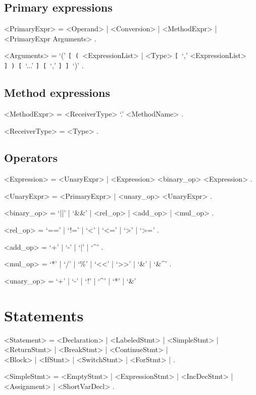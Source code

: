 \documentclass{article}
\def\lopt{\synshortsoff\texttt{[}\synshorts~}
\def\ropt{\synshortsoff\texttt{]}\synshorts~}
\def\lgrp{\synshortsoff\texttt{(}\synshorts~}
\def\rgrp{\synshortsoff\texttt{)}\synshorts~}
\begin{document}
\subsection*{Primary expressions}
\begin{grammar}
	<PrimaryExpr> = <Operand> | <Conversion> | <MethodExpr> | <PrimaryExpr Arguments> .
	
	<Arguments> = `(' \lopt \lgrp <ExpressionList> | <Type> \lopt `,' <ExpressionList> \ropt \rgrp \lopt `...' \ropt \lopt `,' \ropt \ropt `)' .
	
\end{grammar}


\subsection*{Method expressions}
\begin{grammar}
	<MethodExpr> = <ReceiverType> `.' <MethodName> .

	<ReceiverType> = <Type> .
\end{grammar}

\subsection*{Operators}
\begin{grammar}
	<Expression> = <UnaryExpr> | <Expression> <binary_op> <Expression> .

	<UnaryExpr> = <PrimaryExpr> | <unary_op> <UnaryExpr> .

	<binary_op>  = `||' | `\&\&' | <rel_op> | <add_op> | <mul_op> .

	<rel_op> = `==' | `!=' | `<' | `<=' | `>' | `>=' .

	<add_op> = `+' | `-' | `|' | `\^{}' .

	<mul_op> = `*' | `/' | `\%' | `<<' | `>>' | `\&' | `\&\^{}' .

	<unary_op> = `+' | `-' | `!' | `\^{}' | `*' | `\&' %
\end{grammar}


\section*{Statements}
\begin{grammar}
	<Statement> =
		<Declaration> | <LabeledStmt> | <SimpleStmt> | \\
		<ReturnStmt> | <BreakStmt> | <ContinueStmt> | \\
		<Block> | <IfStmt> | <SwitchStmt> | <ForStmt> | .

	<SimpleStmt> = <EmptyStmt> | <ExpressionStmt> | <IncDecStmt> | <Assignment> | <ShortVarDecl> . 
\end{grammar}
\end{document}
